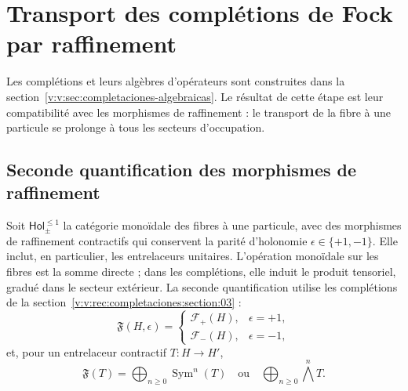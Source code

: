 \section{Transport des complétions de Fock par raffinement}
\label{v:v:rec:fock_gibbs:section:01}

Les complétions et leurs algèbres d’opérateurs sont construites dans la
section~\ref{v:v:sec:completaciones-algebraicas}. Le résultat de cette étape
est leur compatibilité avec les morphismes de raffinement : le transport de
la fibre à une particule se prolonge à tous les secteurs d’occupation.

\subsection{Seconde quantification des morphismes de raffinement}
\label{v:v:rec:fock_gibbs:section:02}

Soit \(\mathsf{Hol}_{\pm}^{\leq1}\) la catégorie monoïdale des fibres à une
particule, avec des morphismes de raffinement contractifs qui conservent la
parité d’holonomie \(\epsilon\in\{+1,-1\}\). Elle inclut, en particulier,
les entrelaceurs unitaires. L’opération monoïdale sur les fibres est
la somme directe ; dans les complétions, elle induit le produit tensoriel,
gradué dans le secteur extérieur. La seconde quantification utilise les
complétions de la section~\ref{v:v:rec:completaciones:section:03} :
\[
 \mathfrak F(H,\epsilon)=
 \begin{cases}
 \mathcal F_+(H),
     &\epsilon=+1,\\[2mm]
 \mathcal F_-(H),
     &\epsilon=-1,
 \end{cases}
\]
et, pour un entrelaceur contractif \(T:H\to H'\),
\[
 \mathfrak F(T)=
 \bigoplus_{n\ge0}\operatorname{Sym}^n(T)
 \quad\text{ou}\quad
 \bigoplus_{n\ge0}\bigwedge^n\!T.
\]

